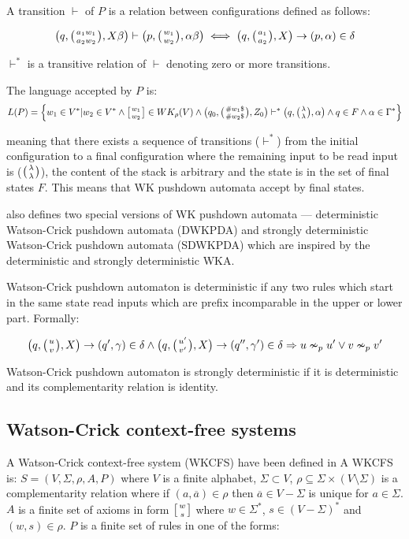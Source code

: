 A transition $\vdash$ of $P$ is a relation between configurations defined as follows:

$$\big(q, \wkpair{a_1w_1}{a_2w_2}, X\beta\big) \vdash \big(p, \wkpair{w_1}{w_2}, \alpha\beta\big) \iff \big(q, \wkpair{a_1}{a_2}, X\big) \rightarrow (p, \alpha) \in \delta$$

$\vdash^*$ is a transitive relation of $\vdash$ denoting zero or more transitions.

The language accepted by $P$ is:
$$L(P) = \Big\{w_1 \in V^*| w_2 \in V^* \wedge \wkdomain{w_1}{w_2} \in WK_{\rho}(V)  \wedge \big(q_0, \wkpair{\#w_1\$}{\#w_2\$}, Z_0\big) \vdash^* \big(q, \wkpair{\lambda}{\lambda}, \alpha \big) \wedge q \in F \wedge \alpha \in \Gamma^* \Big\}$$

meaning that there exists a sequence of transitions ($\vdash^*$) from the initial configuration to a final configuration where the remaining input to be read input is ($\wkpair{\lambda}{\lambda}$), the content of the stack is arbitrary and the state is in the set of final states $F$. This means that WK pushdown automata accept by final states.

\cite {WK_PUSHDOWN_AUT} also defines two special versions of WK pushdown automata --- deterministic Watson-Crick pushdown automata (DWKPDA) and strongly deterministic Watson-Crick pushdown automata (SDWKPDA) which are inspired by the deterministic and strongly deterministic WKA.

Watson-Crick pushdown automaton is deterministic if any two rules which start in the same state read inputs which are prefix incomparable in the upper or lower part. Formally:

$$\big(q, \wkpair{u}{v}, X\big) \rightarrow (q', \gamma) \in \delta \wedge \big(q, \wkpair{u'}{v'}, X\big) \rightarrow (q'', \gamma') \in \delta \Rightarrow u \nsim_p u' \vee v \nsim_p v'$$

Watson-Crick pushdown automaton is strongly deterministic if it is deterministic and its complementarity relation is identity.


\subsection{Watson-Crick context-free systems}
A Watson-Crick context-free system (WKCFS) have been defined in \cite{WKCF_SYSTEMS} A WKCFS is: $S = (V, \Sigma, \rho, A, P)$ where $V$ is a finite alphabet, $\Sigma \subset V$, $\rho \subseteq \Sigma \times (V \setminus \Sigma)$ is a complementarity relation where if $(a, \overline{a}) \in \rho$ then $\overline{a} \in V - \Sigma$ is unique for $a \in \Sigma$. $A$ is a finite set of axioms in form $\wkdomain{w}{s}$ where $w \in \Sigma^*$, $s \in (V - \Sigma)^*$ and $(w, s) \in \rho$. $P$ is a finite set of rules in one of the forms:

